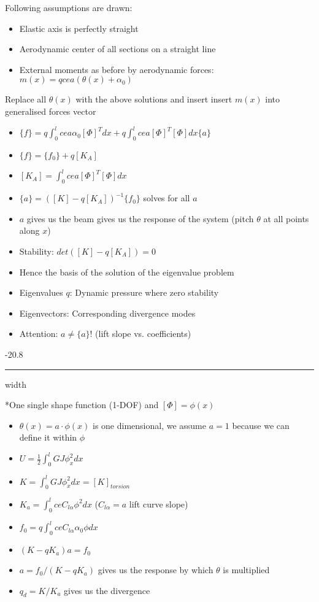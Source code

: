\documentclass[8pt, landscape, fleqn]{scrartcl}
\makeatletter
\renewcommand{\subsubsection}{\@startsection{subsubsection}{1}{0mm}%
{-2\baselineskip}{0.8\baselineskip}%
{\hrule depth 0.2pt width\columnwidth\vspace*{1.2em}\normalsize\bfseries\rmfamily}}
\makeatother
\begin{document}
\begin{multicols*}{3}
Following assumptions are drawn:

\begin{itemize}
    \item Elastic axis is perfectly straight
    \item Aerodynamic center of all sections on a straight line
    \item External moments as before by aerodynamic forces: $m(x) = qcea(\theta(x)+\alpha_0)$
\end{itemize}

Replace all $\theta(x)$ with the above solutions and insert insert $m(x)$ into generalised forces vector

\begin{itemize}
    \item $\{f\} = q \int_0^l cea\alpha_0 [\Phi]^T dx + q \int_0^l cea [\Phi]^T [\Phi] dx \{a\}$
    \item $\{f\} = \{f_0\} + q [K_A] $
    \item $[K_A] = \int_0^l cea [\Phi]^T [\Phi] dx$
    \item $\{a\} = ([K]-q[K_A])^{-1}\{f_0\}$ solves for all $a$
    \item $a$ gives us the beam gives us the response of the system (pitch $\theta$ at all points along $x$)
    \item Stability: $det([K]-q[K_A]) = 0$
    \item Hence the basis of the solution of the eigenvalue problem
    \item Eigenvalues $q$: Dynamic pressure where zero stability 
    \item Eigenvectors: Corresponding divergence modes
    \item Attention: $a \neq \{a\}$! (lift slope vs. coefficients)
\end{itemize}

\subsubsection*{One single shape function (1-DOF) and $[\Phi] = \phi(x)$}

\begin{itemize}
    \item $\theta(x) = a \cdot \phi(x)$ is one dimensional, we assume $a=1$ because we can define it within $\phi$
    \item $U = \frac{1}{2} \int_0^l GJ \phi_x^2 dx$
    \item $K = \int_0^l GJ \phi_x^2 dx = [K]_{torsion}$
    \item $K_a = \int_0^l ce C_{l\alpha} \phi^2 dx$ ($C_{l\alpha} = a$ lift curve slope)
    \item $f_0 = q \int_0^l c e C_{l\alpha} \alpha_0 \phi dx$
    \item $(K-qK_a)a= f_0$
    \item $a = f_0 / (K-qK_a)$ gives us the response by which $\theta$ is multiplied
    \item $q_d = K/K_a$ gives us the divergence
\end{itemize}




\end{multicols*}
\end{document}
